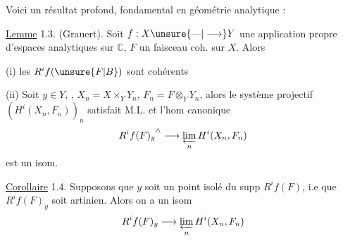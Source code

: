 Voici un résultat  profond, fondamental  en géométrie analytique :

\uline{Lemme} 1.3. (Grauert). Soit $f:X\unsure{\text{---}|\longrightarrow}Y$ une application propre d'espaces analytiques sur $\mathbb C$, $F$ un faisceau coh. sur $X$. Alors

(i) les $R^if(\unsure{F|B})$ sont cohérents

(ii) Soit $y\in Y$, , $X_n=X\times_Y Y_n$, $F_n=F\otimes_Y Y_n$, alors le système projectif $(H^i(X_n,F_n))_n$ satisfait M.L. et l'hom canonique
\[
{R^if(F)_y}^{\wedge}\longrightarrow\varprojlim_n H^i(X_n,F_n)
\]
est un isom.

\uline{Corollaire} 1.4. Supposons que $y$ soit un point isolé du supp $R^if(F)$,  i.e que $R^if(F)_y$ soit artinien. Alors on a un isom
\[
R^if(F)_y\longrightarrow\varprojlim_n H^i(X_n,F_n)
\]
